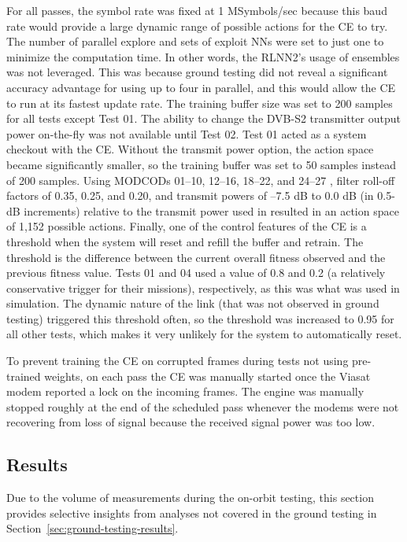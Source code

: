 \documentclass[journal]{IEEEtran}
\begin{document}
For all passes, the symbol rate was fixed at 1 MSymbols/sec because this baud rate would provide a large dynamic range of possible actions for the CE to try.  The number of parallel explore and sets of exploit NNs were set to just one to minimize the computation time.  In other words, the RLNN2's usage of ensembles was not leveraged.  This was because ground testing did not reveal a significant accuracy advantage for using up to four in parallel, and this would allow the CE to run at its fastest update rate.  The training buffer size was set to 200 samples for all tests except Test 01.  The ability to change the DVB-S2 transmitter output power on-the-fly was not available until Test 02.  Test 01 acted as a system checkout with the CE.  Without the transmit power option, the action space became significantly smaller, so the training buffer was set to 50 samples instead of 200 samples.  Using MODCODs 01--10, 12--16, 18--22, and 24--27 \cite{dvbs2-standard}, filter roll-off factors of 0.35, 0.25, and 0.20, and transmit powers of --7.5 dB to 0.0 dB (in 0.5-dB increments) relative to the transmit power used in \cite{downey-paper} resulted in an action space of 1,152 possible actions.  Finally, one of the control features of the CE is a threshold when the system will reset and refill the buffer and retrain.  The threshold is the difference between the current overall fitness observed and the previous fitness value.  Tests 01 and 04 used a value of 0.8 and 0.2 (a relatively conservative trigger for their missions), respectively, as this was what was used in simulation.  The dynamic nature of the link (that was not observed in ground testing) triggered this threshold often, so the threshold was increased to 0.95 for all other tests, which makes it very unlikely for the system to automatically reset.

To prevent training the CE on corrupted frames during tests not using pre-trained weights, on each pass the CE was manually started once the Viasat modem reported a lock on the incoming frames.  The engine was manually stopped roughly at the end of the scheduled pass whenever the modems were not recovering from loss of signal because the received signal power was too low.

\subsection{Results} \label{sec:flight-results}
Due to the volume of measurements during the on-orbit testing, this section provides selective insights from analyses not covered in the ground testing in Section~\ref{sec:ground-testing-results}.
\end{document}
